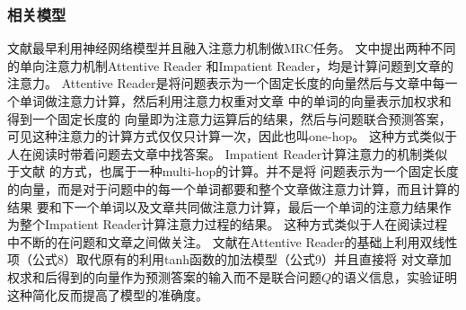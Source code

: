 \begin{center}
\end{center}




\subsubsection{相关模型}

文献\cite{Teaching Machines to Read and Comprehend}最早利用神经网络模型并且融入注意力机制做MRC任务。
文中提出两种不同的单向注意力机制Attentive Reader
和Impatient Reader，均是计算问题到文章的注意力。
Attentive Reader是将问题表示为一个固定长度的向量然后与文章中每一个单词做注意力计算，然后利用注意力权重对文章
中的单词的向量表示加权求和得到一个固定长度的
向量即为注意力运算后的结果，然后与问题联合预测答案，可见这种注意力的计算方式仅仅只计算一次，因此也叫one-hop。
这种方式类似于人在阅读时带着问题去文章中找答案。
Impatient Reader计算注意力的机制类似于文献\cite{neural machine translation by jointly learning to align and translate}
的方式，也属于一种multi-hop的计算。并不是将
问题表示为一个固定长度的向量，而是对于问题中的每一个单词都要和整个文章做注意力计算，而且计算的结果
要和下一个单词以及文章共同做注意力计算，最后一个单词的注意力结果作为整个Impatient Reader计算注意力过程的结果。
这种方式类似于人在阅读过程中不断的在问题和文章之间做关注。
文献\cite{AR}在Attentive Reader的基础上利用双线性项（公式8）取代原有的利用tanh函数的加法模型（公式9）并且直接将
对文章加权求和后得到的向量作为预测答案的输入而不是联合问题$Q$的语义信息，实验证明这种简化反而提高了模型的准确度。

